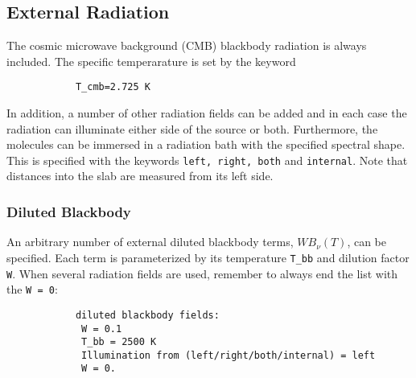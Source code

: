 \documentclass[12pt]{article}
\def\separation {0.5cm}
\begin{document}




\subsection{External Radiation}

The cosmic microwave background (CMB) blackbody radiation is always included. 
The specific temperarature is set by the keyword
\vspace{\separation}
\begin{verbatim}
            T_cmb=2.725 K
\end{verbatim}

In addition, a number of other radiation fields can be added and in each case the radiation can illuminate
either side of the source or both. Furthermore, the molecules can be immersed
in a radiation bath with the specified spectral shape. This is specified with
the keywords \texttt{left, right, both} and \texttt{internal}. Note that
distances into the slab are measured from its left side.

\subsubsection{Diluted Blackbody}

An arbitrary number of external diluted blackbody terms, $WB_\nu(T)$, can be
specified. Each term is parameterized by its temperature \texttt{T\_bb} and
dilution factor \texttt{W}. When several radiation fields are used, remember to
always end the list with the \texttt{W = 0}:

\vspace{\separation}
\begin{verbatim}
            diluted blackbody fields:    
             W = 0.1
             T_bb = 2500 K
             Illumination from (left/right/both/internal) = left
             W = 0.
\end{verbatim}
\end{document}

